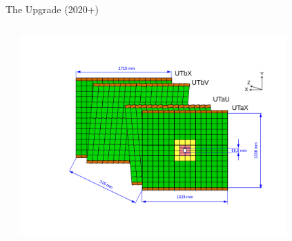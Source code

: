 \documentclass[aspectratio=1610]{beamer}
\begin{document}
\begin{frame}{The \lhcb Upgrade (2020+)}
\begin{columns}
\begin{column}{0.6\textwidth}
\end{column}
\begin{column}{0.4\textwidth}
\centering
\vspace{-1cm}
\includegraphics[width=0.8\textwidth]{figs/detector/UT.pdf}
\end{column}

\end{columns}

\end{frame}
\end{document}
